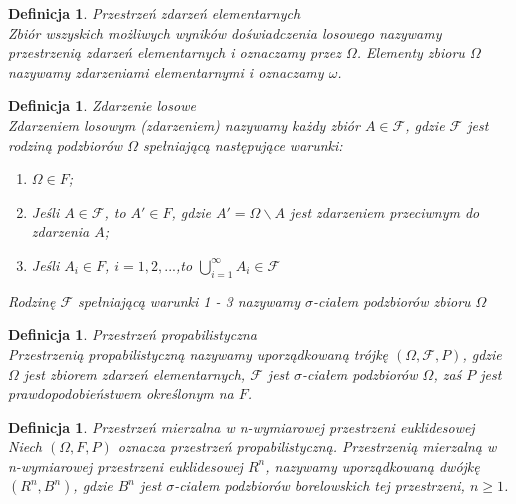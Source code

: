 \documentclass[12pt,a4paper]{report}
\newtheorem{definition}[theorem]{Definicja}
\begin{document}
\begin{definition}{Przestrzeń zdarzeń elementarnych \cite[w oparciu o rozdział 1.1]{krysicki1999}\\}
Zbiór wszyskich możliwych wyników doświadczenia losowego nazywamy przestrzenią zdarzeń elementarnych i oznaczamy przez $\Omega$. Elementy zbioru $\Omega$ nazywamy zdarzeniami elementarnymi i oznaczamy $\omega$.\\
\end{definition}

\begin{definition}{Zdarzenie losowe \cite[w oparciu o rozdział 1.1]{krysicki1999}\\}
Zdarzeniem losowym (zdarzeniem) nazywamy każdy zbiór $\textit{A} \in \mathcal{F}$, gdzie $\mathcal{F}$ jest rodziną podzbiorów $\Omega$ spełniającą następujące warunki:
\begin{enumerate}
\item $\Omega \in F$;
\item Jeśli $A \in \mathcal{F}$, to $\textit{A$'$} \in \textit{F}$, gdzie $\textit{A$'$} = \Omega \backslash A $ jest zdarzeniem przeciwnym do zdarzenia $\textit{A}$;
\item Jeśli $\textit{A}_{i} \in \textit{F}$, $i= 1, 2, ...$,to $\bigcup\limits_{i=1}^{\infty} A_{i} \in \mathcal{F} $
\end{enumerate}
Rodzinę $\mathcal{F}$ spełniającą warunki 1 - 3 nazywamy $\sigma$-ciałem podzbiorów zbioru $\Omega$\\
\end{definition}

\begin{definition}{Przestrzeń propabilistyczna \cite[w oparciu o rozdział 1.2]{krysicki1999}\\}
Przestrzenią propabilistyczną nazywamy uporządkowaną trójkę $(\Omega, \mathcal{F}, P)$, gdzie $\Omega$ jest zbiorem zdarzeń elementarnych, $\mathcal{F}$ jest $\sigma$-ciałem podzbiorów $\Omega$, zaś $P$ jest prawdopodobieństwem określonym na $F$.\\
\end{definition}

\begin{definition}{Przestrzeń mierzalna w n-wymiarowej przestrzeni euklidesowej \cite[Rozdział 1]{bartoszewicz1996}\\}
Niech $(\Omega, F, P)$ oznacza przestrzeń propabilistyczną. Przestrzenią mierzalną w n-wymiarowej przestrzeni euklidesowej $R^n$, nazywamy uporządkowaną dwójkę $(R^n, \textit{B}^n)$, gdzie $\textit{B}^n$ jest $\sigma$-ciałem podzbiorów borelowskich tej przestrzeni, $n \geq 1$. \\
\end{definition}
\end{document}
